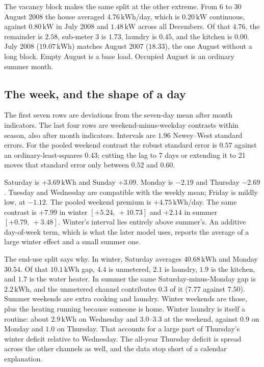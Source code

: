 \documentclass[11pt]{article}
\newcommand{\kwh}{\,\mathrm{kWh}}
\begin{document}
The vacancy block makes the same split at the other extreme. From 6 to
30 August 2008 the house averaged $4.76\kwh$/day, which is $0.20\,\mathrm{kW}$
continuous, against $0.80\,\mathrm{kW}$ in July 2008 and $1.48\,\mathrm{kW}$
across all Decembers. Of that $4.76$, the remainder is $2.58$, sub-meter 3 is
$1.73$, laundry is $0.45$, and the kitchen is $0.00$. July 2008 ($19.07\kwh$)
matches August 2007 ($18.33$), the one August without a long block. Empty
August is a base load. Occupied August is an ordinary summer month.

\subsection{The week, and the shape of a day}

\begin{center}
\small

\end{center}

\noindent
The first seven rows are deviations from the seven-day mean after month
indicators. The last four rows are weekend-minus-weekday contrasts within
season, also after month indicators. Intervals are $1.96$ Newey--West standard
errors. For the pooled weekend contrast the robust standard error is $0.57$
against an ordinary-least-squares $0.43$; cutting the lag to 7 days or
extending it to 21 moves that standard error only between $0.52$ and $0.60$.

Saturday is $+3.69\kwh$ and Sunday $+3.09$. Monday is $-2.19$ and Thursday
$-2.69$. Tuesday and Wednesday are compatible with the weekly mean; Friday is
mildly low, at $-1.12$. The pooled weekend premium is $+4.75\kwh$/day. The
same contrast is $+7.99$ in winter $[+5.24,\ +10.73]$ and $+2.14$ in summer
$[+0.79,\ +3.48]$. Winter's interval lies entirely above summer's. An additive day-of-week
term, which is what the later model uses, reports the average of a large
winter effect and a small summer one.

The end-use split says why. In winter, Saturday averages $40.68\kwh$ and
Monday $30.54$. Of that $10.1\kwh$ gap, $4.4$ is unmetered, $2.1$ is laundry,
$1.9$ is the kitchen, and $1.7$ is the water heater. In summer the same
Saturday-minus-Monday gap is $2.2\kwh$, and the unmetered channel contributes
$0.3$ of it ($7.77$ against $7.50$). Summer weekends are extra cooking and
laundry. Winter weekends are those, plus the heating running because someone
is home. Winter laundry is itself a routine: about $2.9\kwh$ on Wednesday and
$3.0$--$3.3$ at the weekend, against $0.9$ on Monday and $1.0$ on Thursday.
That accounts for a large part of Thursday's winter deficit relative to
Wednesday. The all-year Thursday deficit is spread across the other channels
as well, and the data stop short of a calendar explanation.
\end{document}
